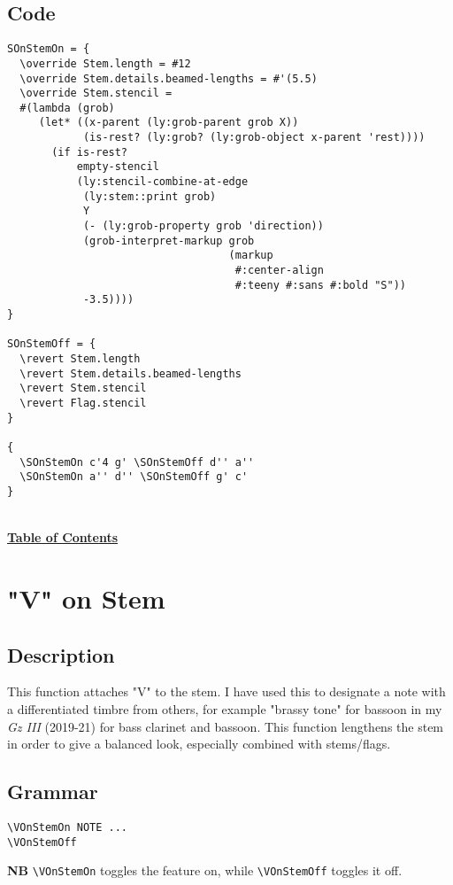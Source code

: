 \documentclass[11pt, oneside]{book}   	%
\begin{document}
\subsection{Code}
\begin{verbatim}
SOnStemOn = {
  \override Stem.length = #12
  \override Stem.details.beamed-lengths = #'(5.5)
  \override Stem.stencil =
  #(lambda (grob)
     (let* ((x-parent (ly:grob-parent grob X))
            (is-rest? (ly:grob? (ly:grob-object x-parent 'rest))))
       (if is-rest?
           empty-stencil
           (ly:stencil-combine-at-edge
            (ly:stem::print grob)
            Y
            (- (ly:grob-property grob 'direction))
            (grob-interpret-markup grob
                                   (markup
                                    #:center-align
                                    #:teeny #:sans #:bold "S"))
            -3.5))))
}

SOnStemOff = {
  \revert Stem.length
  \revert Stem.details.beamed-lengths
  \revert Stem.stencil
  \revert Flag.stencil
}

{
  \SOnStemOn c'4 g' \SOnStemOff d'' a''
  \SOnStemOn a'' d'' \SOnStemOff g' c'
}
\end{verbatim}
\hyperref[sec:toc]{\\ \textbf{Table of Contents}}

\vfill \break




\section {"V" on Stem}
\hfill

\subsection{Description}
This function attaches "V" to the stem. I have used this to designate a note with a differentiated timbre from others, for example "brassy tone" for bassoon in my \textit{Gz III} (2019-21) for bass clarinet and bassoon. This function lengthens the stem in order to give a balanced look, especially combined with stems/flags. 
\subsection{Grammar}
\begin{verbatim}
\VOnStemOn NOTE ...
\VOnStemOff
\end{verbatim}
\textbf{NB} \verb|\VOnStemOn| toggles the feature on, while \verb|\VOnStemOff| toggles it off.
\end{document}
